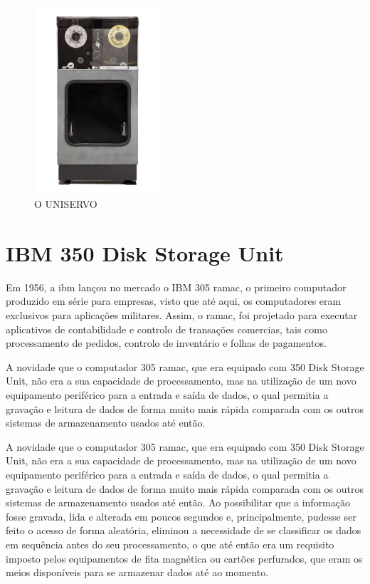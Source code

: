 \documentclass{report}
\begin{document}
\begin{figure}[h]
		\centering
		\includegraphics[width=4.7cm, height=7cm]{uniservo.jpg}
		\caption{O UNISERVO}
		\end{figure}
	
\newpage
		\section{IBM 350 Disk Storage Unit}
		
		Em 1956, a \ac{ibm} lançou no mercado o IBM 305 \ac{ramac}, o primeiro computador produzido em série para empresas, visto que até aqui, os computadores eram exclusivos para aplicações militares. Assim, o \ac{ramac}, foi projetado para executar aplicativos de contabilidade e controlo de transações comercias, tais como processamento de pedidos, controlo de inventário e folhas de pagamentos.
\vspace{1mm}

		A novidade que o computador 305 \ac{ramac}, que era equipado com 350 Disk Storage Unit, não era a sua capacidade de processamento, mas na utilização de um novo equipamento periférico para a entrada e saída de dados, o qual permitia a gravação e leitura de dados de forma muito mais rápida comparada com os outros sistemas de armazenamento usados até então.
\vspace{1mm}
		
		A novidade que o computador 305 \ac{ramac}, que era equipado com 350 Disk Storage Unit, não era a sua capacidade de processamento, mas na utilização de um novo equipamento periférico para a entrada e saída de dados, o qual permitia a gravação e leitura de dados de forma muito mais rápida comparada com os outros sistemas de armazenamento usados até então. Ao possibilitar que a informação fosse gravada, lida e alterada em poucos segundos e, principalmente, pudesse ser feito o acesso de forma aleatória, eliminou a necessidade de se classificar os dados em sequência antes do seu processamento, o que até então era um requisito imposto pelos equipamentos de fita magnética ou cartões perfurados, que eram os meios disponíveis para se armazenar dados até ao momento.
\vspace{1mm}
\end{document}
